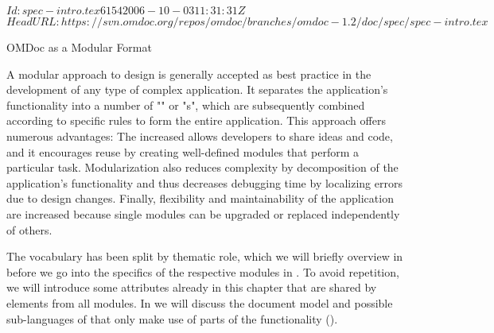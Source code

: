 \svnInfo $Id: spec-intro.tex 6154 2006-10-03 11:31:31Z  $
\svnKeyword $HeadURL: https://svn.omdoc.org/repos/omdoc/branches/omdoc-1.2/doc/spec/spec-intro.tex $

\begin{tchapter}[id=spec-intro]{OMDoc as a Modular Format}

  A modular approach to design is generally accepted as best practice in the development
  of any type of complex application. It separates the application's functionality into a
  number of "{}" or "{s}", which are
  subsequently combined according to specific rules to form the entire application. This
  approach offers numerous advantages: The increased {}
  allows developers to share ideas and code, and it encourages reuse by creating
  well-defined modules that perform a particular task. Modularization also reduces
  complexity by decomposition of the application's functionality and thus decreases
  debugging time by localizing errors due to design changes. Finally, flexibility and
  maintainability of the application are increased because single modules can be upgraded
  or replaced independently of others.

  The {\omdoc} vocabulary has been split by thematic role, which we will briefly overview
  in {} before we go into the specifics of the respective modules
  in {}. To avoid repetition, we will introduce some attributes
  already in this chapter that are shared by elements from all modules. In
  {} we will discuss the {\omdoc} document model and possible
  sub-languages of {\omdoc} that only make use of parts of the functionality
  ().


\end{tchapter}
